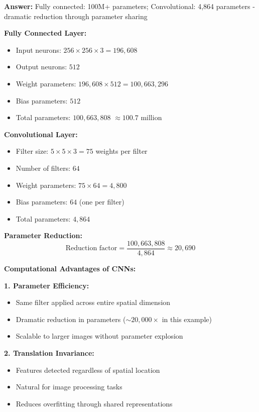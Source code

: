 \documentclass[12pt]{article}
\newcommand{\answer}[1]{{\color{answercolor}\textbf{Answer:} #1}}
\newcommand{\explanation}[1]{{\color{explanationcolor}#1}}
\begin{document}
\begin{enumerate}[(a)]
    \answer{Fully connected: 100M+ parameters; Convolutional: 4,864 parameters - dramatic reduction through parameter sharing}
    
    \explanation{
    \textbf{Fully Connected Layer:}
    \begin{itemize}
        \item Input neurons: $256 \times 256 \times 3 = 196,608$
        \item Output neurons: $512$
        \item Weight parameters: $196,608 \times 512 = 100,663,296$
        \item Bias parameters: $512$
        \item Total parameters: $100,663,808$ $\approx 100.7$ million
    \end{itemize}
    
    \textbf{Convolutional Layer:}
    \begin{itemize}
        \item Filter size: $5 \times 5 \times 3 = 75$ weights per filter
        \item Number of filters: $64$
        \item Weight parameters: $75 \times 64 = 4,800$
        \item Bias parameters: $64$ (one per filter)
        \item Total parameters: $4,864$
    \end{itemize}
    
    \textbf{Parameter Reduction:}
    $$\text{Reduction factor} = \frac{100,663,808}{4,864} \approx 20,690$$
    
    \textbf{Computational Advantages of CNNs:}
    
    \textbf{1. Parameter Efficiency:}
    \begin{itemize}
        \item Same filter applied across entire spatial dimension
        \item Dramatic reduction in parameters ($\sim 20,000\times$ in this example)
        \item Scalable to larger images without parameter explosion
    \end{itemize}
    
    \textbf{2. Translation Invariance:}
    \begin{itemize}
        \item Features detected regardless of spatial location
        \item Natural for image processing tasks
        \item Reduces overfitting through shared representations
    \end{itemize}
    
}
\end{enumerate}
\end{document}
